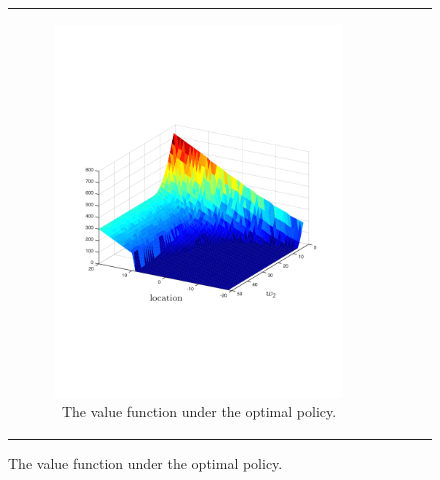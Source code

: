 {\centering
    \begin{figure}[ht]
        \begin{tabular}{cccc}
            \begin{subfigure}{0.24\textwidth}\centering\includegraphics[width=1.0\linewidth]{images/robot_vf_new}\caption{The value function under the optimal policy.}\label{fig:navigation_vf}\end{subfigure}&

\end{tabular}
\end{figure}}
